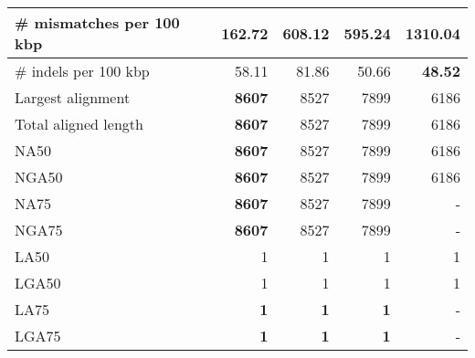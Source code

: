 \documentclass[12pt,a4paper]{article}
\begin{document}
\begin{table}[ht]
\begin{center}
\begin{tabular}{|l*{4}{|r}|}
\# mismatches per 100 kbp & {\bf 162.72} & 608.12 & 595.24 & 1310.04 \\ \hline
\# indels per 100 kbp & 58.11 & 81.86 & 50.66 & {\bf 48.52} \\ \hline
Largest alignment & {\bf 8607} & 8527 & 7899 & 6186 \\ \hline
Total aligned length & {\bf 8607} & 8527 & 7899 & 6186 \\ \hline
NA50 & {\bf 8607} & 8527 & 7899 & 6186 \\ \hline
NGA50 & {\bf 8607} & 8527 & 7899 & 6186 \\ \hline
NA75 & {\bf 8607} & 8527 & 7899 & - \\ \hline
NGA75 & {\bf 8607} & 8527 & 7899 & - \\ \hline
LA50 & 1 & 1 & 1 & 1 \\ \hline
LGA50 & 1 & 1 & 1 & 1 \\ \hline
LA75 & {\bf 1} & {\bf 1} & {\bf 1} & - \\ \hline
LGA75 & {\bf 1} & {\bf 1} & {\bf 1} & - \\ \hline
\end{tabular}
\end{center}
\end{table}
\end{document}
